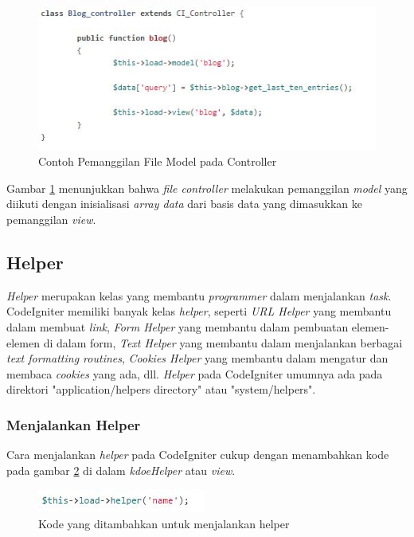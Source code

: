 	\begin{figure}[H]
		\centering
		\includegraphics[scale=1]{Gambar/model}
		\caption{Contoh Pemanggilan File Model pada Controller}
		\label{fig:controllermodel}
	\end{figure}
	
	Gambar \ref{fig:controllermodel} menunjukkan bahwa \textit{file controller} melakukan pemanggilan \textit{model} yang diikuti dengan inisialisasi \textit{array data} dari basis data yang dimasukkan ke pemanggilan \textit{view}.
	
	\subsection{Helper}
	\label{sub: helper}
	
	\textit{Helper} merupakan kelas yang membantu \textit{programmer} dalam menjalankan \textit{task}. CodeIgniter memiliki banyak kelas \textit{helper}, seperti \textit{URL Helper} yang membantu dalam membuat \textit{link}, \textit{Form Helper} yang membantu dalam pembuatan elemen-elemen di dalam form, \textit{Text Helper} yang membantu dalam menjalankan berbagai \textit{text formatting routines}, \textit{Cookies Helper} yang membantu dalam mengatur dan membaca \textit{cookies} yang ada, dll. \textit{Helper} pada CodeIgniter umumnya ada pada direktori "application/helpers directory" atau "system/helpers". 
	
	\subsubsection{Menjalankan Helper}
	\label{subsub: menjalnkanHelper}
	
	Cara menjalankan \textit{helper} pada CodeIgniter cukup dengan menambahkan kode pada gambar \ref{fig:kodeHelper} di dalam \textit{kdoeHelper} atau \textit{view}.
	
	\begin{figure}[H]
		\centering
		\includegraphics[scale=1]{Gambar/helperLoad}
		\caption{Kode yang ditambahkan untuk menjalankan helper}
		\label{fig:kodeHelper}
	\end{figure}
	
